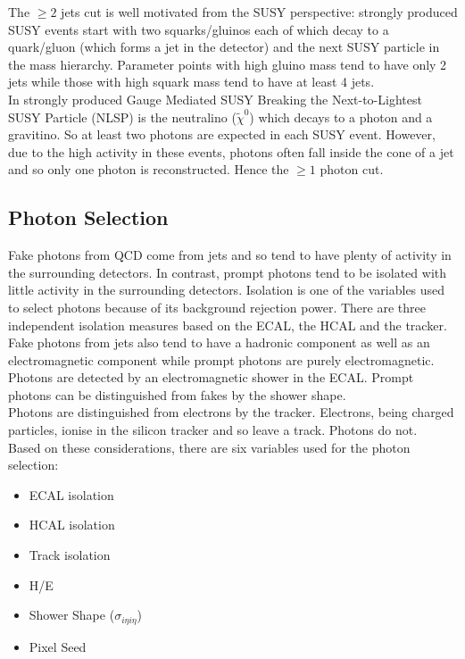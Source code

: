 The $\geq 2$ jets cut is well motivated from the SUSY perspective: strongly
produced SUSY events start with two squarks/gluinos each of which decay to a 
quark/gluon (which forms a jet in the detector) and the next SUSY particle in 
the mass hierarchy. Parameter points with high gluino mass tend to have only 2 
jets while those with high squark mass tend to have at least 4 jets. \\

In strongly produced Gauge Mediated SUSY Breaking the Next-to-Lightest SUSY 
Particle (NLSP) is the neutralino ($\tilde{\chi}^{0}$) which decays to a photon and 
a gravitino. So at least two photons are expected in each SUSY event. However, 
due to the high activity in these events, photons often fall inside the cone of
a jet and so only one photon is reconstructed. Hence the $\geq 1$ photon cut. \\

\subsection{Photon Selection}

Fake photons from QCD come from jets and so tend to have plenty of activity in
the surrounding detectors. In contrast, prompt photons tend to be isolated with
little activity in the surrounding detectors. Isolation is one of the variables
used to select photons because of its background rejection power. There are
three independent isolation measures based on the ECAL, the HCAL and the
tracker. \\

Fake photons from jets also tend to have a hadronic component as well as an
electromagnetic component while prompt photons are purely electromagnetic. \\ 

Photons are detected by an electromagnetic shower in the ECAL. Prompt photons
can be distinguished from fakes by the shower shape. \\

Photons are distinguished from electrons by the tracker. Electrons, being
charged particles, ionise in the silicon tracker and so leave a track. Photons
do not. \\ 

Based on these considerations, there are six variables used for the photon 
selection:

\begin{itemize}
\item ECAL isolation
\item HCAL isolation
\item Track isolation
\item H/E
\item Shower Shape ($\sigma_{i\eta i\eta}$)
\item Pixel Seed
\end{itemize}

